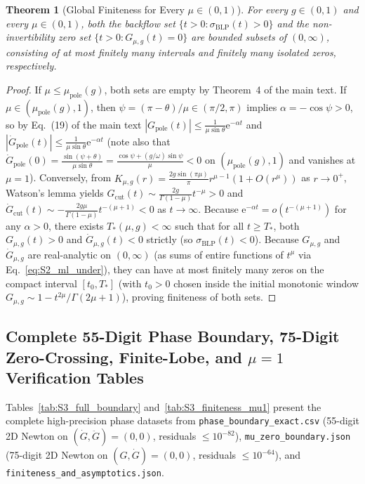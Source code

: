 \documentclass[onecolumn,10pt,notitlepage,amsmath,amssymb,floatfix]{revtex4-2}
\theoremstyle{plain}
\newtheorem{theorem}{Theorem}[section]
\theoremstyle{definition}
\newcommand{\ee}{\mathrm{e}}
\newcommand{\mupole}{\mu_{\mathrm{pole}}}
\begin{document}
\begin{theorem}[Global Finiteness for Every $\mu \in (0,1)$]
\label{thm:S3_finite}
For every $g \in (0,1)$ and every $\mu \in (0,1)$, both the backflow set $\{t > 0 : \sigma_{\mathrm{BLP}}(t) > 0\}$ and the non-invertibility zero set $\{t > 0 : G_{\mu,g}(t) = 0\}$ are bounded subsets of $(0,\infty)$, consisting of at most finitely many intervals and finitely many isolated zeros, respectively.
\end{theorem}
\begin{proof}
If $\mu \le \mupole(g)$, both sets are empty by Theorem~4 of the main text. If $\mu \in (\mupole(g), 1)$, then $\psi = (\pi-\theta)/\mu \in (\pi/2, \pi)$ implies $\alpha = -\cos\psi > 0$, so by Eq.~(19) of the main text $|G_{\mathrm{pole}}(t)| \le \frac{1}{\mu\sin\theta}\ee^{-\alpha t}$ and $|\dot{G}_{\mathrm{pole}}(t)| \le \frac{1}{\mu\sin\theta}\ee^{-\alpha t}$ (note also that $\dot{G}_{\mathrm{pole}}(0) = \frac{\sin(\psi+\theta)}{\mu\sin\theta} = \frac{\cos\psi + (g/\omega)\sin\psi}{\mu} < 0$ on $(\mupole(g), 1)$ and vanishes at $\mu = 1$). Conversely, from $K_{\mu,g}(r) = \frac{2g\sin(\pi\mu)}{\pi} r^{\mu-1}(1 + O(r^\mu))$ as $r \to 0^+$, Watson's lemma yields $G_{\mathrm{cut}}(t) \sim \frac{2g}{\Gamma(1-\mu)} t^{-\mu} > 0$ and $\dot{G}_{\mathrm{cut}}(t) \sim -\frac{2g\mu}{\Gamma(1-\mu)} t^{-(\mu+1)} < 0$ as $t \to \infty$. Because $\ee^{-\alpha t} = o(t^{-(\mu+1)})$ for any $\alpha > 0$, there exists $T_*(\mu,g) < \infty$ such that for all $t \ge T_*$, both $G_{\mu,g}(t) > 0$ and $\dot{G}_{\mu,g}(t) < 0$ strictly (so $\sigma_{\mathrm{BLP}}(t) < 0$). Because $G_{\mu,g}$ and $\dot{G}_{\mu,g}$ are real-analytic on $(0,\infty)$ (as sums of entire functions of $t^\mu$ via Eq.~\eqref{eq:S2_ml_under}), they can have at most finitely many zeros on the compact interval $[t_0, T_*]$ (with $t_0 > 0$ chosen inside the initial monotonic window $G_{\mu,g} \sim 1 - t^{2\mu}/\Gamma(2\mu+1)$), proving finiteness of both sets.
\end{proof}

\subsection{Complete 55-Digit Phase Boundary, 75-Digit Zero-Crossing, Finite-Lobe, and \texorpdfstring{$\mu = 1$}{mu = 1} Verification Tables}

Tables~\ref{tab:S3_full_boundary} and~\ref{tab:S3_finiteness_mu1} present the complete high-precision phase datasets from \texttt{phase\_boundary\_exact.csv} (55-digit 2D Newton on $(\dot{G},\ddot{G})=(0,0)$, residuals $\le 10^{-82}$), \texttt{mu\_zero\_boundary.json} (75-digit 2D Newton on $(G,\dot{G})=(0,0)$, residuals $\le 10^{-64}$), and \texttt{finiteness\_and\_asymptotics.json}.
\end{document}
